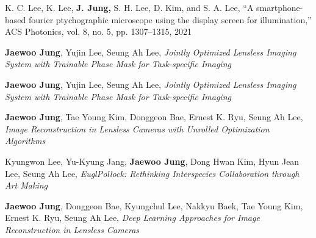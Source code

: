 \documentclass[a4paper,12pt]{memoir} %
\begin{document}
\Sep

{K. C. Lee, K. Lee, \textbf{J. Jung,} S. H. Lee, D. Kim, and S. A. Lee, “A smartphone-based fourier ptychographic microscope using the display screen for illumination,” ACS Photonics, vol. 8, no. 5, pp. 1307–1315, 2021}

\Sep %




{\textbf{Jaewoo Jung}, Yujin Lee, Seung Ah Lee, \textit{Jointly Optimized Lensless Imaging System with Trainable Phase Mask for Task-specific Imaging}}



{\textbf{Jaewoo Jung}, Yujin Lee, Seung Ah Lee, \textit{Jointly Optimized Lensless Imaging System with Trainable Phase Mask for Task-specific Imaging}}


{\textbf{Jaewoo Jung}, Tae Young Kim, Donggeon Bae, Ernest K. Ryu, Seung Ah Lee, \textit{Image Reconstruction in Lensless Cameras with Unrolled Optimization Algorithms}}



{Kyungwon Lee, Yu-Kyung Jang, \textbf{Jaewoo Jung}, Dong Hwan Kim, Hyun Jean Lee, Seung Ah Lee, \textit{EuglPollock: Rethinking Interspecies Collaboration through Art Making}}




{\textbf{Jaewoo Jung}, Donggeon Bae, Kyungchul Lee, Nakkyu Baek, Tae Young Kim, Ernest K. Ryu, Seung Ah Lee, \textit{Deep Learning Approaches for Image Reconstruction in Lensless Cameras}}
\end{document}
